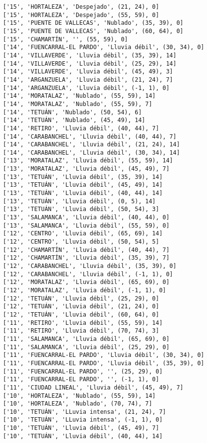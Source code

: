 \documentclass[11pt]{article}
\begin{document}
\begin{Verbatim}[commandchars=\\\{\}]
['15', 'HORTALEZA', 'Despejado', (21, 24), 0]
['15', 'HORTALEZA', 'Despejado', (55, 59), 0]
['15', 'PUENTE DE VALLECAS', 'Nublado', (35, 39), 0]
['15', 'PUENTE DE VALLECAS', 'Nublado', (60, 64), 0]
['15', 'CHAMARTÍN', '', (55, 59), 0]
['14', 'FUENCARRAL-EL PARDO', 'Lluvia débil', (30, 34), 0]
['14', 'VILLAVERDE', 'Lluvia débil', (35, 39), 14]
['14', 'VILLAVERDE', 'Lluvia débil', (25, 29), 14]
['14', 'VILLAVERDE', 'Lluvia débil', (45, 49), 3]
['14', 'ARGANZUELA', 'Lluvia débil', (21, 24), 7]
['14', 'ARGANZUELA', 'Lluvia débil', (-1, 1), 0]
['14', 'MORATALAZ', 'Nublado', (55, 59), 14]
['14', 'MORATALAZ', 'Nublado', (55, 59), 7]
['14', 'TETUÁN', 'Nublado', (50, 54), 6]
['14', 'TETUÁN', 'Nublado', (45, 49), 14]
['14', 'RETIRO', 'Lluvia débil', (40, 44), 7]
['14', 'CARABANCHEL', 'Lluvia débil', (40, 44), 7]
['14', 'CARABANCHEL', 'Lluvia débil', (21, 24), 14]
['14', 'CARABANCHEL', 'Lluvia débil', (30, 34), 14]
['13', 'MORATALAZ', 'Lluvia débil', (55, 59), 14]
['13', 'MORATALAZ', 'Lluvia débil', (45, 49), 7]
['13', 'TETUÁN', 'Lluvia débil', (35, 39), 14]
['13', 'TETUÁN', 'Lluvia débil', (45, 49), 14]
['13', 'TETUÁN', 'Lluvia débil', (40, 44), 14]
['13', 'TETUÁN', 'Lluvia débil', (0, 5), 14]
['13', 'TETUÁN', 'Lluvia débil', (50, 54), 3]
['13', 'SALAMANCA', 'Lluvia débil', (40, 44), 0]
['13', 'SALAMANCA', 'Lluvia débil', (55, 59), 0]
['12', 'CENTRO', 'Lluvia débil', (65, 69), 14]
['12', 'CENTRO', 'Lluvia débil', (50, 54), 5]
['12', 'CHAMARTÍN', 'Lluvia débil', (40, 44), 7]
['12', 'CHAMARTÍN', 'Lluvia débil', (35, 39), 7]
['12', 'CARABANCHEL', 'Lluvia débil', (35, 39), 0]
['12', 'CARABANCHEL', 'Lluvia débil', (-1, 1), 0]
['12', 'MORATALAZ', 'Lluvia débil', (65, 69), 0]
['12', 'MORATALAZ', 'Lluvia débil', (-1, 1), 0]
['12', 'TETUÁN', 'Lluvia débil', (25, 29), 0]
['12', 'TETUÁN', 'Lluvia débil', (21, 24), 0]
['12', 'TETUÁN', 'Lluvia débil', (60, 64), 0]
['11', 'RETIRO', 'Lluvia débil', (55, 59), 14]
['11', 'RETIRO', 'Lluvia débil', (70, 74), 3]
['11', 'SALAMANCA', 'Lluvia débil', (65, 69), 0]
['11', 'SALAMANCA', 'Lluvia débil', (25, 29), 0]
['11', 'FUENCARRAL-EL PARDO', 'Lluvia débil', (30, 34), 0]
['11', 'FUENCARRAL-EL PARDO', 'Lluvia débil', (35, 39), 0]
['11', 'FUENCARRAL-EL PARDO', '', (25, 29), 0]
['11', 'FUENCARRAL-EL PARDO', '', (-1, 1), 0]
['11', 'CIUDAD LINEAL', 'Lluvia débil', (45, 49), 7]
['10', 'HORTALEZA', 'Nublado', (55, 59), 14]
['10', 'HORTALEZA', 'Nublado', (70, 74), 7]
['10', 'TETUÁN', 'LLuvia intensa', (21, 24), 7]
['10', 'TETUÁN', 'LLuvia intensa', (-1, 1), 0]
['10', 'TETUÁN', 'Lluvia débil', (45, 49), 7]
['10', 'TETUÁN', 'Lluvia débil', (40, 44), 14]

\end{Verbatim}
\end{document}
